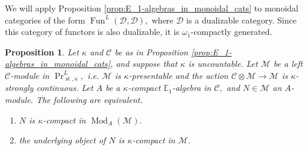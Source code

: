 \documentclass[11pt,leqno]{amsart}
\newtheorem{prop}[theo]{Proposition}
\numberwithin{equation}{section}
\newcommand{\Cone}{\operatorname{Cone}}
\newcommand{\st}{\operatorname{st}}
\newcommand{\bE}{{\mathbb E}}
\newcommand{\cM}{{\mathcal M}}
\newcommand{\cD}{{\mathcal D}}
\newcommand{\cC}{{\mathcal C}}
\newcommand{\un}{\underline}
\newcommand{\Fun}{\operatorname{Fun}}
\newcommand{\Alg}{\operatorname{Alg}}
\newcommand{\Mod}{\operatorname{Mod}}
\begin{document}


We will apply Proposition \ref{prop:E_1-algebras_in_monoidal_cats} to monoidal categories of the form $\Fun^{L}(\cD,\cD),$ where $\cD$ is a dualizable category. Since this category of functors is also dualizable, it is $\omega_1$-compactly generated.

\begin{prop}\label{prop:compactness_in_E-modules} Let $\kappa$ and $\cC$ be as in Proposition \ref{prop:E_1-algebras_in_monoidal_cats}, and suppose that $\kappa$ is uncountable. Let $\cM$ be a left $\cC$-module in $\Pr^L_{\st,\kappa},$ i.e. $\cM$ is $\kappa$-presentable and the action $\cC\otimes\cM\to\cM$ is $\kappa$-strongly continuous. Let $A$ be a $\kappa$-compact $\bE_1$-algebra in $\cC,$ and $N\in\cM$ an $A$-module. The following are equivalent.

\begin{enumerate}[label=(\roman*),ref=(\roman*)]
\item $N$ is $\kappa$-compact in $\Mod_A(\cM).$ \label{kappa_comp_E_1_alg1}

\item the underlying object of $N$ is $\kappa$-compact in $\cM.$ \label{kappa_comp_E_1_alg2}
\end{enumerate}
\end{prop}
\end{document}
